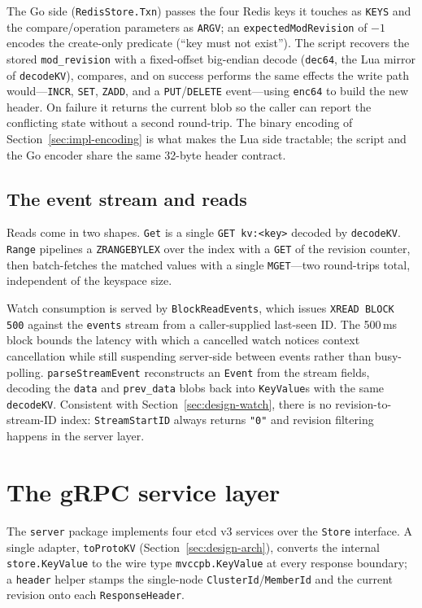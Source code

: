 The Go side (\texttt{RedisStore.Txn}) passes the four Redis keys it touches as \texttt{KEYS} and the compare/operation parameters as \texttt{ARGV}; an \texttt{expectedModRevision} of $-1$ encodes the create-only predicate (``key must not exist''). The script recovers the stored \texttt{mod\_revision} with a fixed-offset big-endian decode (\texttt{dec64}, the Lua mirror of \texttt{decodeKV}), compares, and on success performs the same effects the write path would---\texttt{INCR}, \texttt{SET}, \texttt{ZADD}, and a \texttt{PUT}/\texttt{DELETE} event---using \texttt{enc64} to build the new header. On failure it returns the current blob so the caller can report the conflicting state without a second round-trip. The binary encoding of Section~\ref{sec:impl-encoding} is what makes the Lua side tractable; the script and the Go encoder share the same 32-byte header contract.

\subsection{The event stream and reads}
\label{sec:impl-events}

Reads come in two shapes. \texttt{Get} is a single \texttt{GET kv:<key>} decoded by \texttt{decodeKV}. \texttt{Range} pipelines a \texttt{ZRANGEBYLEX} over the index with a \texttt{GET} of the revision counter, then batch-fetches the matched values with a single \texttt{MGET}---two round-trips total, independent of the keyspace size.

Watch consumption is served by \texttt{BlockReadEvents}, which issues \texttt{XREAD BLOCK 500} against the \texttt{events} stream from a caller-supplied last-seen ID. The 500\,ms block bounds the latency with which a cancelled watch notices context cancellation while still suspending server-side between events rather than busy-polling. \texttt{parseStreamEvent} reconstructs an \texttt{Event} from the stream fields, decoding the \texttt{data} and \texttt{prev\_data} blobs back into \texttt{KeyValue}s with the same \texttt{decodeKV}. Consistent with Section~\ref{sec:design-watch}, there is no revision-to-stream-ID index: \texttt{StreamStartID} always returns \texttt{"0"} and revision filtering happens in the server layer.

\section{The gRPC service layer}
\label{sec:impl-server}

The \texttt{server} package implements four etcd v3 services over the \texttt{Store} interface. A single adapter, \texttt{toProtoKV} (Section~\ref{sec:design-arch}), converts the internal \texttt{store.KeyValue} to the wire type \texttt{mvccpb.KeyValue} at every response boundary; a \texttt{header} helper stamps the single-node \texttt{ClusterId}/\texttt{MemberId} and the current revision onto each \texttt{ResponseHeader}.

